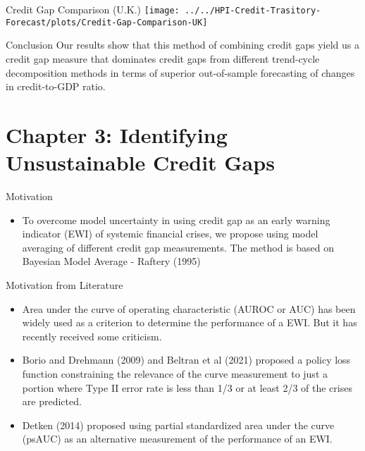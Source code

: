 \documentclass[
  ignorenonframetext,
]{beamer}
\providecommand{\tightlist}{%
  \setlength{\itemsep}{0pt}\setlength{\parskip}{0pt}}
\begin{document}
\begin{frame}{Credit Gap Comparison (U.K.)}
\protect\hypertarget{credit-gap-comparison-u.k.}{}
\texttt{[image: ../../HPI-Credit-Trasitory-Forecast/plots/Credit-Gap-Comparison-UK]}
\end{frame}

\begin{frame}{Conclusion}
\protect\hypertarget{conclusion-1}{}
Our results show that this method of combining credit gaps yield us a
credit gap measure that dominates credit gaps from different trend-cycle
decomposition methods in terms of superior out-of-sample forecasting of
changes in credit-to-GDP ratio.
\end{frame}

\hypertarget{chapter-3-identifying-unsustainable-credit-gaps}{%
\section{Chapter 3: Identifying Unsustainable Credit
Gaps}\label{chapter-3-identifying-unsustainable-credit-gaps}}

\begin{frame}{Motivation}
\protect\hypertarget{motivation-2}{}
\begin{itemize}
\tightlist
\item
  To overcome model uncertainty in using credit gap as an early warning
  indicator (EWI) of systemic financial crises, we propose using model
  averaging of different credit gap measurements. The method is based on
  Bayesian Model Average - Raftery (1995)
\end{itemize}
\end{frame}

\begin{frame}{Motivation from Literature}
\protect\hypertarget{motivation-from-literature}{}
\begin{itemize}
\tightlist
\item
  Area under the curve of operating characteristic (AUROC or AUC) has
  been widely used as a criterion to determine the performance of a EWI.
  But it has recently received some criticism.
\item
  Borio and Drehmann (2009) and Beltran et al (2021) proposed a policy
  loss function constraining the relevance of the curve measurement to
  just a portion where Type II error rate is less than 1/3 or at least
  2/3 of the crises are predicted.\\
\item
  Detken (2014) proposed using partial standardized area under the curve
  (psAUC) as an alternative measurement of the performance of an EWI.
\end{itemize}
\end{frame}
\end{document}
